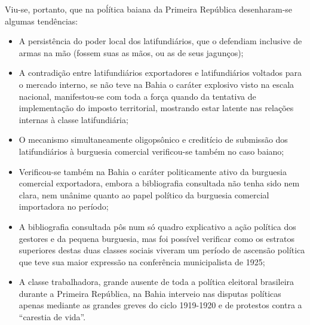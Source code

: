Viu-se, portanto, que na poĺítica baiana da Primeira República desenharam-se algumas tendências:

\begin{itemize}
\item A persistência do poder local dos latifundiários, que o defendiam inclusive de armas na mão (fossem suas as mãos, ou as de seus jagunços);
\item A contradição entre latifundiários exportadores e latifundiários voltados para o mercado interno, se não teve na Bahia o caráter explosivo visto na escala nacional, manifestou-se com toda a força quando da tentativa de implementação do imposto territorial, mostrando estar latente nas relações internas à classe latifundiária;
\item O mecanismo simultaneamente oligopsônico e creditício de submissão dos latifundiários à burguesia comercial verificou-se também no caso baiano;
\item Verificou-se também na Bahia o caráter politicamente ativo da burguesia comercial exportadora, embora a bibliografia consultada não tenha sido nem clara, nem unânime quanto ao papel político da burguesia comercial importadora no período;
\item A bibliografia consultada pôs num só quadro explicativo a ação política dos gestores e da pequena burguesia, mas foi possível verificar como os estratos superiores destas duas classes sociais viveram um período de ascensão política que teve sua maior expressão na conferência municipalista de 1925;
\item A classe trabalhadora, grande ausente de toda a política eleitoral brasileira durante a Primeira República, na Bahia interveio nas disputas políticas apenas mediante as grandes greves do ciclo 1919-1920 e de protestos contra a ``carestia de vida''.
\end{itemize}